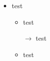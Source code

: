 \documentclass{beamer}
\begin{document}
    
\begin{frame}
  \begin{itemize}
  \item test
    \begin{itemize}
    \item test
    \item[$\rightarrow$] test
    \item test
    \end{itemize}
  \end{itemize}
\end{frame} 
    
\end{document}
